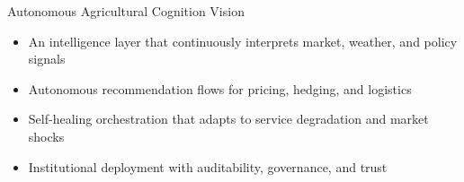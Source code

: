 \documentclass[aspectratio=169,10pt]{beamer}
\begin{document}
\begin{frame}{Autonomous Agricultural Cognition Vision}
\begin{itemize}\setlength{\itemsep}{0.3ex}
    \small
    \item An intelligence layer that continuously interprets market, weather, and policy signals
    \item Autonomous recommendation flows for pricing, hedging, and logistics
    \item Self-healing orchestration that adapts to service degradation and market shocks
    \item Institutional deployment with auditability, governance, and trust
\end{itemize}
\end{frame}
\end{document}
